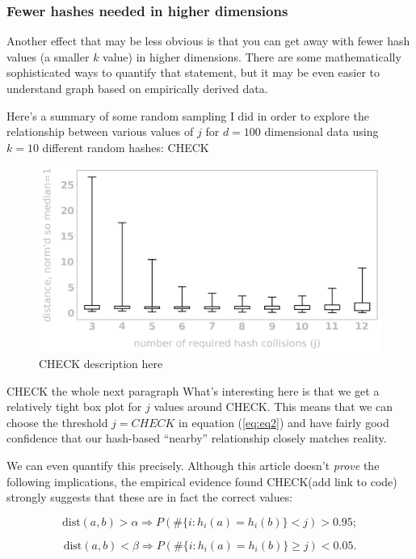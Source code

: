 \documentclass[20pt,]{extarticle}
\begin{document}
\subsubsection{Fewer hashes needed in higher
dimensions}\label{fewer-hashes-needed-in-higher-dimensions}

Another effect that may be less obvious is that you can get away with
fewer hash values (a smaller \(k\) value) in higher dimensions. There
are some mathematically sophisticated ways to quantify that statement,
but it may be even easier to understand graph based on empirically
derived data.

Here's a summary of some random sampling I did in order to explore the
relationship between various values of \(j\) for \(d=100\) dimensional
data using \(k=10\) different random hashes: CHECK

\begin{figure}
\centering
\includegraphics{images/image9@2x.png}
\caption{CHECK description here}\label{fig:fig9}
\end{figure}

CHECK the whole next paragraph What's interesting here is that we get a
relatively tight box plot for \(j\) values around CHECK. This means that
we can choose the threshold \(j=CHECK\) in equation (\ref{eq:eq2}) and
have fairly good confidence that our hash-based ``nearby'' relationship
closely matches reality.

We can even quantify this precisely. Although this article doesn't
\emph{prove} the following implications, the empirical evidence found
CHECK(add link to code) strongly suggests that these are in fact the
correct values:

\[ \text{dist}(a, b) > \alpha \Rightarrow P(\#\{i : h_i(a) = h_i(b)\} < j) > 0.95; \]

\[ \text{dist}(a, b) < \beta  \Rightarrow P(\#\{i : h_i(a) = h_i(b)\} \ge j) < 0.05. \]
\end{document}
